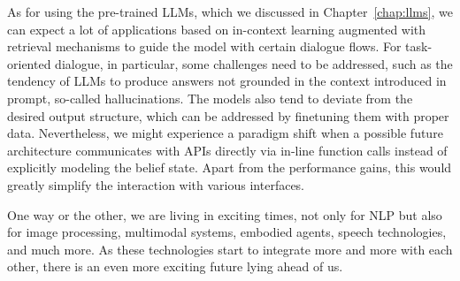 As for using the pre-trained LLMs, which we discussed in Chapter~\ref{chap:llms},
we can expect a lot of applications based on in-context learning augmented with retrieval mechanisms to guide the model with certain dialogue flows.
For task-oriented dialogue, in particular, some challenges need to be addressed, such as the tendency of LLMs to produce answers not grounded in the context introduced in prompt, so-called hallucinations.
The models also tend to deviate from the desired output structure, which can be addressed by finetuning them with proper data.
Nevertheless, we might experience a paradigm shift when a possible future architecture communicates with APIs directly via in-line function calls instead of explicitly modeling the belief state.
Apart from the performance gains, this would greatly simplify the interaction with various interfaces.

One way or the other, we are living in exciting times, not only for NLP but also for image processing, multimodal systems, embodied agents, speech technologies, and much more.
As these technologies start to integrate more and more with each other, there is an even more exciting future lying ahead of us.
